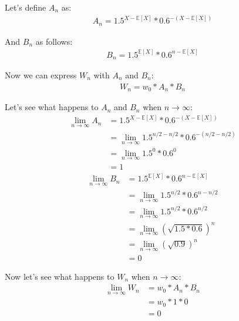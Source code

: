 \documentclass[12pt]{article}
\begin{document}
Let's define $A_n$ as:
\begin{align}
  \begin{equation*}
    A_n = 1.5^{X - \mathbb{E}[X]} * 0.6^{-(X - \mathbb{E}[X])}
  \end{equation*}
\end{align}

And $B_n$ as follows:
\begin{align}
  \begin{equation*}
    B_n = 1.5^{\mathbb{E}[X]} * 0.6^{n - \mathbb{E}[X]}
  \end{equation*}
\end{align}

Now we can express $W_n$ with $A_n$ and $B_n$:
\begin{align}
  \begin{equation*}
    W_n = w_0 * A_n * B_n
  \end{equation*}
\end{align}

Let's see what happens to $A_n$ and $B_n$ when $n \rightarrow \infty$:
\begin{equation*}
  \begin{split}
    \lim_{n\to\infty} A_n &=  1.5^{X - \mathbb{E}[X]} * 0.6^{-(X - \mathbb{E}[X])}\\
    &= \lim_{n\to\infty} 1.5^{n/2 - n/2} * 0.6^{- (n/2 - n/2)} \\
    &= \lim_{n\to\infty} 1.5^0 * 0.6^0 \\
    & = 1
  \end{split}
\end{equation*}
\begin{equation*}
  \begin{split}
    \lim_{n\to\infty} B_n &=  1.5^{\mathbb{E}[X]} * 0.6^{n - \mathbb{E}[X]} \\
    &= \lim_{n\to\infty} 1.5^{n/2} * 0.6^{n - n/2} \\
    &= \lim_{n\to\infty} 1.5^{n/2} * 0.6^{n/2} \\
    &= \lim_{n\to\infty} (\sqrt{1.5*0.6})^{n}\\
    &= \lim_{n\to\infty} (\sqrt{0.9}) ^{n}\\
    &= 0
  \end{split}
\end{equation*}

Now let's see what happens to $W_n$ when $n \rightarrow \infty$:
\begin{equation*}
  \begin{split}
    \lim_{n\to\infty} W_n &= w_0 * A_n * B_n\\
    & = w_0 * 1 * 0 \\
    & = 0
  \end{split}
\end{equation*}
\end{document}
